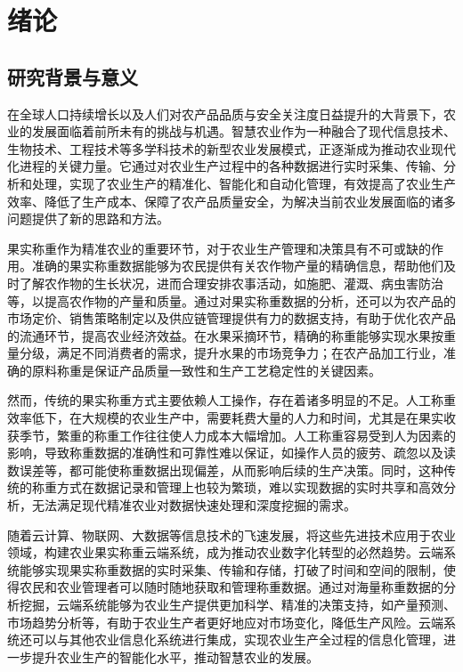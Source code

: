 \documentclass{xduugthesis}
\begin{document}
\chapter{绪论}

\section{研究背景与意义}

在全球人口持续增长以及人们对农产品品质与安全关注度日益提升的大背景下，农业的发展面临着前所未有的挑战与机遇。智慧农业作为一种融合了现代信息技术、生物技术、工程技术等多学科技术的新型农业发展模式\cite{赵春江2021智慧农业的发展现状与未来展望}，正逐渐成为推动农业现代化进程的关键力量。它通过对农业生产过程中的各种数据进行实时采集、传输、分析和处理，实现了农业生产的精准化、智能化和自动化管理\cite{李道亮2012物联网与智慧农业}，有效提高了农业生产效率、降低了生产成本、保障了农产品质量安全，为解决当前农业发展面临的诸多问题提供了新的思路和方法。

果实称重作为精准农业的重要环节，对于农业生产管理和决策具有不可或缺的作用\cite{罗锡文2016信息技术提升农业机械化水平}。准确的果实称重数据能够为农民提供有关农作物产量的精确信息，帮助他们及时了解农作物的生长状况\cite{翁杨2019基于深度学习的农业植物表型研究综述}，进而合理安排农事活动，如施肥、灌溉、病虫害防治等，以提高农作物的产量和质量。通过对果实称重数据的分析，还可以为农产品的市场定价、销售策略制定以及供应链管理提供有力的数据支持，有助于优化农产品的流通环节，提高农业经济效益\cite{Lipcsei2021AnalysisOA}。在水果采摘环节，精确的称重能够实现水果按重量分级，满足不同消费者的需求，提升水果的市场竞争力\cite{Ji2019}；在农产品加工行业，准确的原料称重是保证产品质量一致性和生产工艺稳定性的关键因素。

然而，传统的果实称重方式主要依赖人工操作，存在着诸多明显的不足。人工称重效率低下，在大规模的农业生产中，需要耗费大量的人力和时间，尤其是在果实收获季节，繁重的称重工作往往使人力成本大幅增加\cite{Jiang2012}。人工称重容易受到人为因素的影响，导致称重数据的准确性和可靠性难以保证，如操作人员的疲劳、疏忽以及读数误差等，都可能使称重数据出现偏差，从而影响后续的生产决策\cite{Chen2002}。同时，这种传统的称重方式在数据记录和管理上也较为繁琐，难以实现数据的实时共享和高效分析，无法满足现代精准农业对数据快速处理和深度挖掘的需求\cite{Widagdo2020RecordingSO}。

随着云计算、物联网、大数据等信息技术的飞速发展，将这些先进技术应用于农业领域，构建农业果实称重云端系统，成为推动农业数字化转型的必然趋势。云端系统能够实现果实称重数据的实时采集、传输和存储，打破了时间和空间的限制，使得农民和农业管理者可以随时随地获取和管理称重数据\cite{李道亮2012物联网与智慧农业}。通过对海量称重数据的分析挖掘，云端系统能够为农业生产提供更加科学、精准的决策支持，如产量预测、市场趋势分析等，有助于农业生产者更好地应对市场变化，降低生产风险\cite{韩佳伟2022装备与信息协同促进现代智慧农业发展研究}。云端系统还可以与其他农业信息化系统进行集成\cite{刘洋2013基于物联网与云计算服务的农业温室智能化平台研究与应用术}，实现农业生产全过程的信息化管理，进一步提升农业生产的智能化水平，推动智慧农业的发展。
\end{document}
